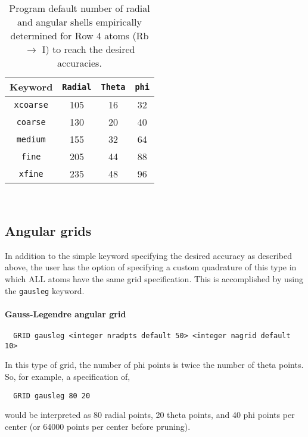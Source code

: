 \begin{table}[h]
\begin{center}
\caption{Program default number of radial and angular shells empirically determined for Row 4 atoms
  (Rb $\rightarrow$ I) to reach the desired accuracies.}

\vspace{.2in}

  \begin{tabular}[right]{|c|c|c|c|} \hline
Keyword & {\tt Radial} & {\tt Theta} & {\tt phi} \\ \hline
{\tt xcoarse} &105 & 16 & 32  \\ \hline
{\tt coarse}  &130 & 20 & 40  \\ \hline
{\tt medium}  &155 & 32 & 64  \\ \hline
{\tt fine}    &205 & 44 & 88  \\ \hline
{\tt xfine}   &235 & 48 & 96  \\ \hline
  \end{tabular} \\
\end{center}
\end{table}

\clearpage

\subsection{Angular grids}

In addition to the simple keyword specifying the desired accuracy as
described above, the user has the option of specifying a custom
quadrature of this type in which ALL atoms have the same grid
specification.  This is accomplished by using the \verb+gausleg+ keyword.

\paragraph{Gauss-Legendre angular grid}

\begin{verbatim}
  GRID gausleg <integer nradpts default 50> <integer nagrid default 10> 
\end{verbatim}

In this type of grid, the number of phi points is twice the number of
theta points. So, for example, a specification of,
\begin{verbatim}
  GRID gausleg 80 20
\end{verbatim}
would be interpreted as 80 radial points, 20 theta points, and 40
phi points per center (or 64000 points per center before pruning).

